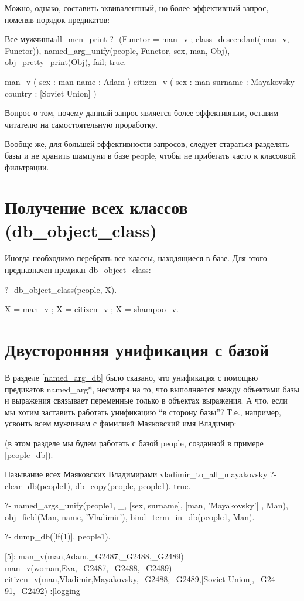 \documentclass[a4paper]{book}
\def\Te{Т.\thinspace е.}
\def\na{named\_arg*}
\begin{document}
Можно, однако, составить эквивалентный, но более эффективный
запрос, поменяв порядок предикатов:

\begin{example}{Все мужчины}{all_men_print}
?- (Functor = man_v ; class_descendant(man_v, Functor)), 
   named_arg_unify(people, Functor, sex, man, Obj), 
   obj_pretty_print(Obj), fail; true.

man_v ( 
  sex : man 
  name : Adam 
) 
citizen_v ( 
  sex : man 
  surname : Mayakovsky 
  country : [Soviet Union] 
) 
\end{example}

Вопрос о том, почему данный запрос является более эффективным,
оставим читателю на самостоятельную проработку.

Вообще же, для большей эффективности запросов, следует стараться
разделять базы и не хранить шампуни в базе people, чтобы не
прибегать часто к классовой фильтрации.

\section{Получение всех классов (db\_object\_class)}
\label{db_object_class}

Иногда необходимо перебрать все классы, находящиеся в базе. Для
этого предназначен предикат db\_object\_class:

\begin{example}{}{}
?- db_object_class(people, X).

X = man_v ;
X = citizen_v ;
X = shampoo_v.
\end{example}

\section{Двусторонняя унификация с базой}
\label{bind_term_in_db}

В разделе \ref{named_arg_db} было сказано, что унификация с
помощью предикатов \na{}, несмотря на то, что выполняется между
объектами базы и выражения связывает переменные только в объектах
выражения. А что, если мы хотим заставить работать унификацию ``в
сторону базы''? \Te, например, усвоить всем мужчинам с фамилией
Маяковский имя Владимир:

(в этом разделе мы будем работать с базой people, созданной в
примере \ref{people_db}).

\begin{example}{Называние всех Маяковских Владимирами}%
               {vladimir_to_all_mayakovsky}
?- clear_db(people1), db_copy(people, people1).
true.

?- named_args_unify(people1, _, 
      [sex, surname], [man, 'Mayakovsky'] , Man), 
   obj_field(Man, name, 'Vladimir'), 
   bind_term_in_db(people1, Man).

?- dump_db([lf(1)], people1).

[5]: man_v(man,Adam,_G2487,_G2488,_G2489) 
man_v(woman,Eva,_G2487,_G2488,_G2489) 
citizen_v(man,Vladimir,Mayakovsky,_G2488,_G2489,[Soviet Union],_G24
91,_G2492)                                                        
 :[logging]
\end{example}
\end{document}
